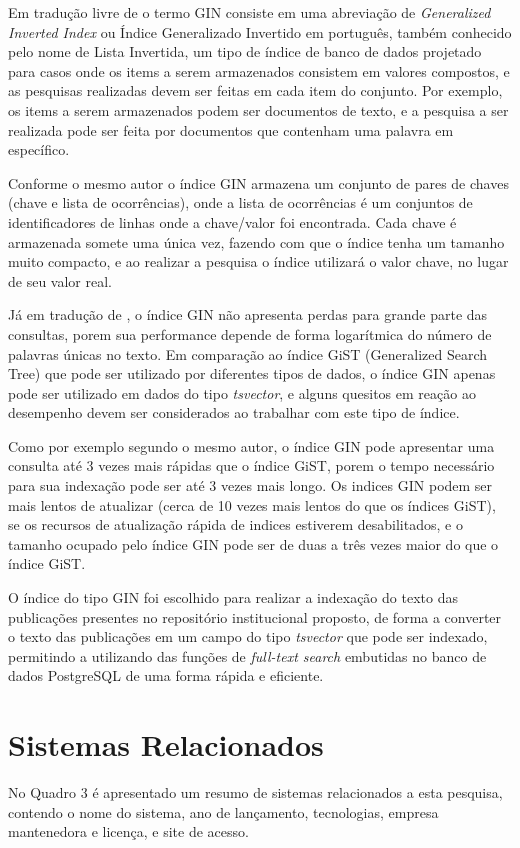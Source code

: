 Em tradução livre de \cite{2022:PostgreSQL} o termo GIN consiste em uma
abreviação de \emph{Generalized Inverted Index} ou Índice Generalizado Invertido em
português, também conhecido pelo nome de Lista Invertida, um tipo de índice de banco
de dados projetado para casos onde os items a serem armazenados consistem em valores
compostos, e as pesquisas realizadas devem ser feitas em cada item do conjunto.
Por exemplo, os items a serem armazenados podem ser documentos de texto, e a pesquisa
a ser realizada pode ser feita por documentos que contenham uma palavra em específico.

Conforme o mesmo autor o índice GIN armazena um conjunto de pares de chaves (chave e lista
de ocorrências), onde a lista de ocorrências é um conjuntos de identificadores de linhas
onde a chave/valor foi encontrada. Cada chave é armazenada somete uma única vez,
fazendo com que o índice tenha um tamanho muito compacto, e ao realizar a pesquisa
o índice utilizará o valor chave, no lugar de seu valor real.

Já em tradução de \cite{2011:PostgreSQL}, o índice GIN não apresenta perdas para
grande parte das consultas, porem sua performance depende de forma logarítmica do
número de palavras únicas no texto. Em comparação ao índice GiST (Generalized Search Tree)
que pode ser utilizado por diferentes tipos de dados, o índice GIN apenas pode ser utilizado
em dados do tipo \emph{tsvector}, e alguns quesitos em reação ao desempenho devem ser considerados
ao trabalhar com este tipo de índice.

Como por exemplo segundo o mesmo autor, o índice GIN pode apresentar uma consulta
até 3 vezes mais rápidas que o índice GiST, porem o tempo necessário para sua indexação
pode ser até 3 vezes mais longo. Os indices GIN podem ser mais lentos
de atualizar (cerca de 10 vezes mais lentos do que os índices GiST), se os recursos de
atualização rápida de indices estiverem desabilitados, e o tamanho ocupado pelo índice
GIN pode ser de duas a três vezes maior do que o índice GiST.

O índice do tipo GIN foi escolhido para realizar a indexação do texto das publicações
presentes no repositório institucional proposto, de forma a converter o texto das
publicações em um campo do tipo \emph{tsvector} que pode ser indexado, permitindo
a utilizando das funções de \emph{full-text search} embutidas no banco de dados PostgreSQL
de uma forma rápida e eficiente.

\section{Sistemas Relacionados}\label{sec:rs}
No Quadro 3 é apresentado um resumo de sistemas relacionados
a esta pesquisa, contendo o nome do sistema, ano de lançamento, tecnologias,
empresa mantenedora e licença, e site de acesso.

